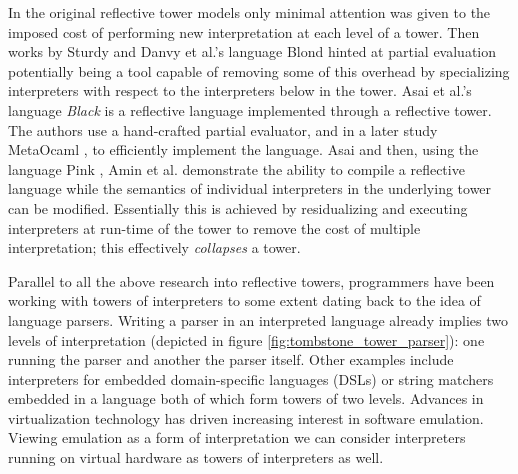 \documentclass[a4paper,12pt,twoside,openright]{report}
\theoremstyle{definition}
\begin{document}
In the original reflective tower models only minimal attention was given to the imposed cost of performing new interpretation at each level of a tower. Then works by Sturdy \cite{sturdy1993lisp} and Danvy et al.'s language Blond \cite{danvy1988intensions} hinted at partial evaluation potentially being a tool capable of removing some of this overhead by specializing interpreters with respect to the interpreters below in the tower. Asai et al.'s language \textit{Black} \cite{asai1996duplication} is a reflective language implemented through a reflective tower. The authors use a hand-crafted partial evaluator, and in a later study MetaOcaml \cite{asai2015compiling}, to efficiently implement the language. Asai and then, using the language Pink \cite{amin2017collapsing}, Amin et al. demonstrate the ability to compile a reflective language while the semantics of individual interpreters in the underlying tower can be modified. Essentially this is achieved by residualizing and executing interpreters at run-time of the tower to remove the cost of multiple interpretation; this effectively \textit{collapses} a tower.

Parallel to all the above research into reflective towers, programmers have been working with towers of interpreters to some extent dating back to the idea of language parsers. Writing a parser in an interpreted language already implies two levels of interpretation (depicted in figure \ref{fig:tombstone_tower_parser}): one running the parser and another the parser itself. Other examples include interpreters for embedded domain-specific languages (DSLs) or string matchers embedded in a language both of which form towers of two levels. Advances in virtualization technology has driven increasing interest in software emulation. Viewing emulation as a form of interpretation we can consider interpreters running on virtual hardware as towers of interpreters as well.
\end{document}
